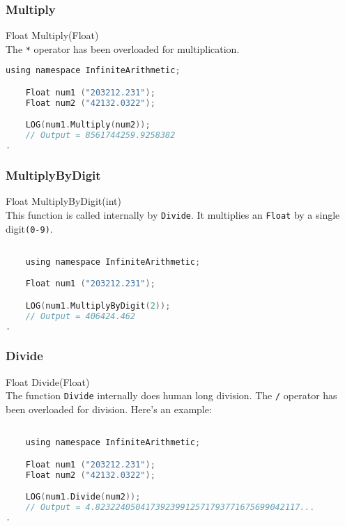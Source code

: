 \subsubsection{Multiply}
{\ttfamily \large Float Multiply(Float)} \\[2mm]
The \verb|*| operator has been overloaded for multiplication.
\vspace*{1em}
\begin{lstlisting}[language = C]	
	using namespace InfiniteArithmetic;

	Float num1 ("203212.231");
	Float num2 ("42132.0322");

	LOG(num1.Multiply(num2));
	// Output = 8561744259.9258382
.
\end{lstlisting}
\vspace*{1em}


\subsubsection{MultiplyByDigit}
{\ttfamily \large Float MultiplyByDigit(int)} \\[2mm]
This function is called internally by \verb|Divide|. It multiplies an \verb|Float| by a single digit\verb|(0-9)|.
\vspace*{0em}
\begin{lstlisting}[language = C]

	using namespace InfiniteArithmetic;

	Float num1 ("203212.231");

	LOG(num1.MultiplyByDigit(2));
	// Output = 406424.462
.
\end{lstlisting}


\subsubsection{Divide}
{\ttfamily \large Float Divide(Float)} \\[2mm]
The function \verb|Divide| internally does human long division. The \verb|/| operator has been overloaded for division. Here's an example:
\vspace*{1em}
\begin{lstlisting}[language = C]	

	using namespace InfiniteArithmetic;

	Float num1 ("203212.231");
	Float num2 ("42132.0322");

	LOG(num1.Divide(num2));
	// Output = 4.82322405041739239912571793771675699042117...
.
\end{lstlisting}
\vspace*{1em}

